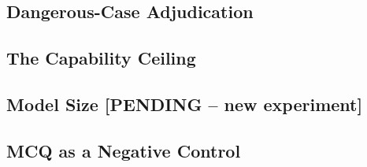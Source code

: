 \subsection{Dangerous-Case Adjudication}

\subsection{The Capability Ceiling}

\subsection{Model Size [PENDING -- new experiment]}

\subsection{MCQ as a Negative Control}
